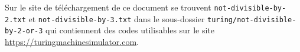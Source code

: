 Sur le site de téléchargement de ce document se trouvent
\verb+not-divisible-by-2.txt+ et \verb+not-divisible-by-3.txt+
dans le sous-dossier \verb+turing/not-divisible-by-2-or-3+
qui contiennent des codes utilisables sur le site \url{https://turingmachinesimulator.com}.